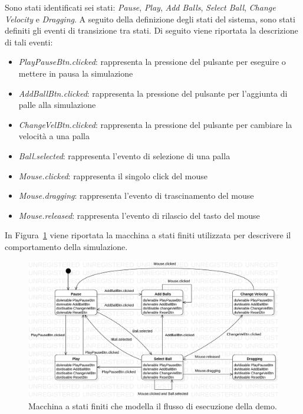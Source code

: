 Sono stati identificati sei stati: \textit{Pause}, \textit{Play}, \textit{Add Balls}, \textit{Select Ball},
\textit{Change Velocity} e \textit{Dragging}.
A seguito della definizione degli stati del sistema, sono stati definiti gli eventi di transizione tra stati.
Di seguito viene riportata la descrizione di tali eventi:
\begin{itemize}
    \item \textit{PlayPauseBtn.clicked}: rappresenta la pressione del pulsante per eseguire o mettere in pausa la
    simulazione
    \item \textit{AddBallBtn.clicked}: rappresenta la pressione del pulsante per l'aggiunta di palle alla simulazione
    \item \textit{ChangeVelBtn.clicked}: rappresenta la pressione del pulsante per cambiare la velocità a una palla
    \item \textit{Ball.selected}: rappresenta l'evento di selezione di una palla
    \item \textit{Mouse.clicked}: rappresenta il singolo click del mouse
    \item \textit{Mouse.dragging}: rappresenta l'evento di trascinamento del mouse
    \item \textit{Mouse.released}: rappresenta l'evento di rilascio del tasto del mouse
\end{itemize}

In Figura~\ref{fig:fsm-demo} viene riportata la macchina a stati finiti utilizzata per descrivere il comportamento
della simulazione.

\begin{figure}[H]
    \centering
    \includegraphics[width=\textwidth]{img/fsm-demo}
    \caption{Macchina a stati finiti che modella il flusso di esecuzione della demo.}\label{fig:fsm-demo}
\end{figure}


